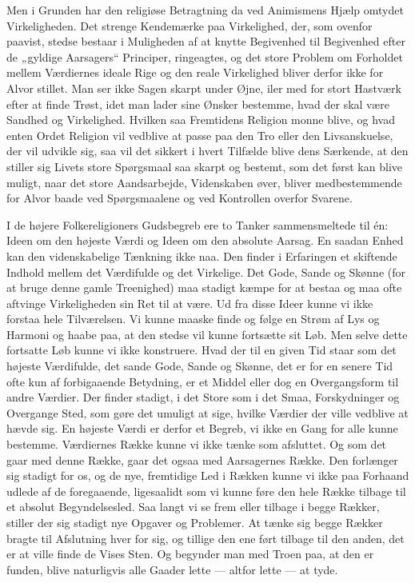 \documentclass[12pt,a4paper]{article}
\newcommand{\opage}[1]{\marginnote{\footnotesize\textit{[#1]}}}
\begin{document}
Men i Grunden har den religiøse Betragtning da ved Animismens Hjælp omtydet
Virkeligheden. Det strenge Kendemærke paa Virkelighed, der, som ovenfor
paavist, stedse bestaar i Muligheden af at knytte Begivenhed til Begivenhed
efter de „gyldige Aarsagers“ Principer, ringeagtes, og det store Problem om
Forholdet mellem Værdiernes ideale Rige og den reale Virkelighed bliver
derfor ikke for Alvor stillet. Man ser ikke Sagen skarpt under Øjne, iler med
for stort Hastværk efter at finde Trøst, idet man lader sine Ønsker
bestemme, hvad der skal være Sandhed og Virkelighed. Hvilken saa Fremtidens
Religion monne blive, og hvad enten Ordet Religion vil vedblive at passe paa
den Tro eller den Livsanskuelse, der vil udvikle sig, saa vil det sikkert i
hvert \opage{33} Tilfælde blive dens Særkende, at den stiller sig Livets store
Spørgsmaal saa skarpt og bestemt, som det først kan blive muligt, naar det
store Aandsarbejde, Videnskaben øver, bliver medbestemmende for Alvor baade
ved Spørgsmaalene og ved Kontrollen overfor Svarene.

I de højere Folkereligioners Gudsbegreb ere to Tanker sammensmeltede til én:
Ideen om den højeste Værdi og Ideen om den absolute Aarsag. En saadan Enhed
kan den videnskabelige Tænkning ikke naa. Den finder i Erfaringen et
skiftende Indhold mellem det Værdifulde og det Virkelige. Det Gode, Sande og
Skønne (for at bruge denne gamle Treenighed) maa stadigt kæmpe for at bestaa
og maa ofte aftvinge Virkeligheden sin Ret til at være. Ud fra disse Ideer
kunne vi ikke forstaa hele Tilværelsen. Vi kunne maaske finde og følge en
Strøm af Lys og Harmoni og haabe paa, at den stedse vil kunne fortsætte sit
Løb. Men selve dette fortsatte Løb kunne vi ikke konstruere. Hvad der til en
given Tid staar som det højeste Værdifulde, det sande Gode, Sande og Skønne,
det er for en senere Tid ofte kun af forbigaaende Betydning, er et Middel
eller dog en Overgangsform til andre Værdier. Der finder stadigt, i det Store
som i det Smaa, Forskydninger og Overgange Sted, som gøre det umuligt at
sige, hvilke Værdier der ville vedblive at hævde sig. En højeste Værdi er
derfor et Begreb, vi ikke en Gang for alle kunne bestemme. Værdiernes Række
kunne vi ikke tænke som afsluttet. Og som det gaar med denne Række, gaar det
ogsaa med Aarsagernes Række. Den forlænger sig stadigt for os, og de nye,
fremtidige Led i Rækken kunne vi ikke paa Forhaand udlede af de foregaaende,
ligesaalidt som vi kunne føre den hele Række tilbage til et absolut
Begyndelsesled. Saa langt vi se frem eller tilbage i begge Rækker, stiller
der sig stadigt nye Opgaver og Problemer. At tænke sig begge Rækker bragte
til Afslutning hver for sig, og tillige den ene ført tilbage til den anden,
det er at ville \opage{34} finde de Vises Sten. Og begynder man med Troen paa, at den er
funden, blive naturligvis alle Gaader lette --- altfor lette --- at tyde.
\end{document}
